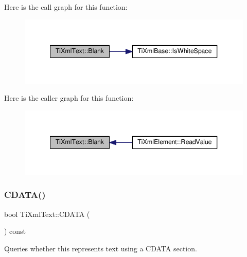 Here is the call graph for this function\+:
\nopagebreak
\begin{figure}[H]
\begin{center}
\leavevmode
\includegraphics[width=340pt]{class_ti_xml_text_a0fd9005b279def46859b72f336b158da_cgraph}
\end{center}
\end{figure}
Here is the caller graph for this function\+:
\nopagebreak
\begin{figure}[H]
\begin{center}
\leavevmode
\includegraphics[width=340pt]{class_ti_xml_text_a0fd9005b279def46859b72f336b158da_icgraph}
\end{center}
\end{figure}
\mbox{\label{class_ti_xml_text_aac1f4764d220ed6bf809b16dfcb6b45a}} 
\subsubsection{\texorpdfstring{C\+D\+A\+T\+A()}{CDATA()}}
{\footnotesize\ttfamily bool Ti\+Xml\+Text\+::\+C\+D\+A\+TA (\begin{DoxyParamCaption}{ }\end{DoxyParamCaption}) const\hspace{0.3cm}{\ttfamily [inline]}}



Queries whether this represents text using a C\+D\+A\+TA section. 

